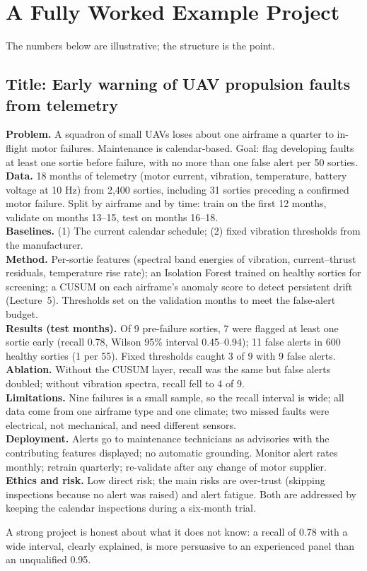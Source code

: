 \documentclass[11pt]{article}
\begin{document}
\section{A Fully Worked Example Project}
The numbers below are illustrative; the structure is the point.
\subsection*{Title: Early warning of UAV propulsion faults from telemetry}
\textbf{Problem.} A squadron of small UAVs loses about one airframe a quarter to in-flight motor failures. Maintenance is calendar-based. Goal: flag developing faults at least one sortie before failure, with no more than one false alert per 50 sorties.\\
\textbf{Data.} 18 months of telemetry (motor current, vibration, temperature, battery voltage at 10 Hz) from 2,400 sorties, including 31 sorties preceding a confirmed motor failure. Split by airframe and by time: train on the first 12 months, validate on months 13--15, test on months 16--18.\\
\textbf{Baselines.} (1) The current calendar schedule; (2) fixed vibration thresholds from the manufacturer.\\
\textbf{Method.} Per-sortie features (spectral band energies of vibration, current--thrust residuals, temperature rise rate); an Isolation Forest trained on healthy sorties for screening; a CUSUM on each airframe's anomaly score to detect persistent drift (Lecture~5). Thresholds set on the validation months to meet the false-alert budget.\\
\textbf{Results (test months).} Of 9 pre-failure sorties, 7 were flagged at least one sortie early (recall 0.78, Wilson 95\% interval 0.45--0.94); 11 false alerts in 600 healthy sorties (1 per 55). Fixed thresholds caught 3 of 9 with 9 false alerts.\\
\textbf{Ablation.} Without the CUSUM layer, recall was the same but false alerts doubled; without vibration spectra, recall fell to 4 of 9.\\
\textbf{Limitations.} Nine failures is a small sample, so the recall interval is wide; all data come from one airframe type and one climate; two missed faults were electrical, not mechanical, and need different sensors.\\
\textbf{Deployment.} Alerts go to maintenance technicians as advisories with the contributing features displayed; no automatic grounding. Monitor alert rates monthly; retrain quarterly; re-validate after any change of motor supplier.\\
\textbf{Ethics and risk.} Low direct risk; the main risks are over-trust (skipping inspections because no alert was raised) and alert fatigue. Both are addressed by keeping the calendar inspections during a six-month trial.
\begin{keypoint}A strong project is honest about what it does not know: a recall of 0.78 with a wide interval, clearly explained, is more persuasive to an experienced panel than an unqualified 0.95.\end{keypoint}
\end{document}

